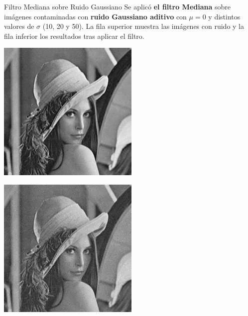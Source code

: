 \documentclass{beamer}
\begin{document}
\begin{frame}[fragile]{Filtro Mediana sobre Ruido Gaussiano}
	\justifying
	\footnotesize
	Se aplicó \textcolor{unahurverde}{\textbf{el filtro Mediana}} sobre imágenes contaminadas con \textcolor{unahurverde}{\textbf{ruido Gaussiano aditivo}}  
	con $\mu = 0$ y distintos valores de $\sigma$ (10, 20 y 50).  
	La fila superior muestra las imágenes con ruido y la fila inferior los resultados tras aplicar el filtro.
	
	\centering
	\begin{minipage}{0.25\linewidth}
		\centering
		\includegraphics[width=\linewidth]{../results/lena_gauss_sigma10}
	\end{minipage}\hfill
	\begin{minipage}{0.25\linewidth}
		\centering
		\includegraphics[width=\linewidth]{../results/lena_gauss_sigma20}

\end{minipage}
\end{frame}
\end{document}
